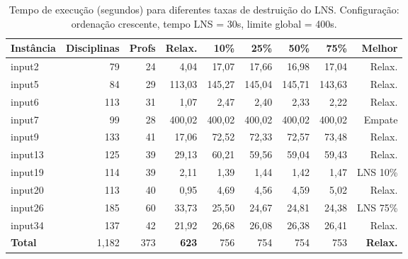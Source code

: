 

\begin{table}[htbp]
\centering
\caption{Tempo de execução (segundos) para diferentes taxas de destruição do LNS. Configuração: ordenação crescente, tempo LNS = 30s, limite global = 400s.}
\label{tab:lns_cand_tempo}
\small
\begin{tabular}{@{}lrrrrrrrr@{}}
\toprule
\textbf{Instância} & \textbf{Disciplinas} & \textbf{Profs} & \textbf{Relax.} & \textbf{10\%} & \textbf{25\%} & \textbf{50\%} & \textbf{75\%} & \textbf{Melhor} \\
\midrule
input2  & 79  & 24 & 4,04    & 17,07  & 17,66  & 16,98  & 17,04  & Relax. \\
input5  & 84  & 29 & 113,03  & 145,27 & 145,04 & 145,71 & 143,63 & Relax. \\
input6  & 113 & 31 & 1,07    & 2,47   & 2,40   & 2,33   & 2,22   & Relax. \\
input7  & 99  & 28 & 400,02  & 400,02 & 400,02 & 400,02 & 400,02 & Empate \\
input9  & 133 & 41 & 17,06   & 72,52  & 72,33  & 72,57  & 73,48  & Relax. \\
input13 & 125 & 39 & 29,13   & 60,21  & 59,56  & 59,04  & 59,43  & Relax. \\
input19 & 114 & 39 & 2,11    & 1,39   & 1,44   & 1,42   & 1,47   & LNS 10\% \\
input20 & 113 & 40 & 0,95    & 4,69   & 4,56   & 4,59   & 5,02   & Relax. \\
input26 & 185 & 60 & 33,73   & 25,50  & 24,67  & 24,81  & 24,38  & LNS 75\% \\
input34 & 137 & 42 & 21,92   & 26,68  & 26,08  & 26,38  & 26,41  & Relax. \\
\midrule
\textbf{Total}  & 1,182 &373 & \textbf{623} & 756 & 754 & 754 & 753 & \textbf{Relax.} \\
\bottomrule
\end{tabular}
\end{table}

